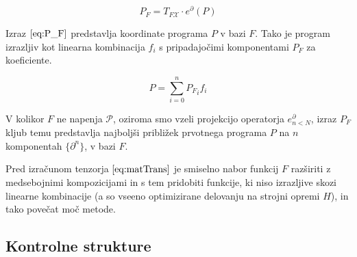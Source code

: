 \documentclass{article}
\newcommand{\X}{\mathcal{X}}
\newcommand{\dP}{\mathcal{P}}
\newcommand{\D}{\partial}
\begin{document}
  \begin{equation}\label{eq:P_F}
  	P_F=T_{F\X}\cdot e^\D(P)
  \end{equation}
  
  Izraz $\eqref{eq:P_F}$ predstavlja koordinate programa $P$ v bazi $F$. Tako je program izrazljiv kot linearna kombinacija $f_i$ s pripadajočimi komponentami $P_F$ za koeficiente.
  
  \begin{equation}
  P=\sum\limits_{i=0}^{n}{P_F}_if_i
  \end{equation}
  
  V kolikor $F$ ne napenja $\dP$, oziroma smo vzeli projekcijo operatorja $e^\D_{n<N}$, izraz $P_F$ kljub temu predstavlja najboljši približek prvotnega programa $P$ na $n$ komponentah $\{\D^n\}$, v bazi $F$.
  
  Pred izračunom tenzorja $\eqref{eq:matTrans}$ je smiselno nabor funkcij $F$ razširiti z medsebojnimi kompozicijami in s tem pridobiti funkcije, ki niso izrazljive skozi linearne kombinacije (a so vseeno optimizirane delovanju na strojni opremi $H$), in tako povečat moč metode.
  
 \subsection{Kontrolne strukture}
 
\end{document}
